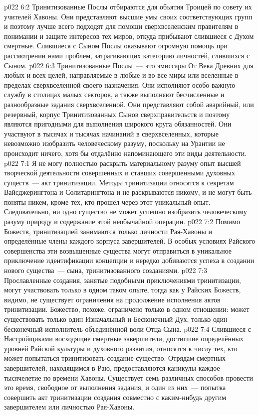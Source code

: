 \vs p022 6:2 Тринитизованные Послы отбираются для объятия Троицей по совету их учителей Хавоны. Они представляют высшие умы своих соответствующих групп и поэтому лучше всего подходят для помощи сверхвселенским правителям в понимании и защите интересов тех миров, откуда прибывают слившиеся с Духом смертные. Слившиеся с Сыном Послы оказывают огромную помощь при рассмотрении нами проблем, затрагивающих категорию личностей, слившихся с Сыном.
\vs p022 6:3 Тринитизованные Послы~--- это эмиссары От Века Древних для любых и всех целей, направляемые в любые и во все миры или вселенные в пределах сверхвселенной своего назначения. Они исполняют особо важную службу в столицах малых секторов, а также выполняют бесчисленные и разнообразные задания сверхвселенной. Они представляют собой аварийный, или резервный, корпус Тринитизованных Сынов сверхправительств и поэтому являются пригодными для выполнения широкого круга обязанностей. Они участвуют в тысячах и тысячах начинаний в сверхвселенных, которые невозможно изобразить человеческому разуму, поскольку на Урантии не происходит ничего, хотя бы отдалённо напоминающего эти виды деятельности.
\vs p022 7:1 Я не могу полностью раскрыть материальному разуму опыт высшей творческой деятельности совершенных и ставших совершенными духовных существ~--- акт тринитизации. Методы тринитизации относятся к секретам Вайсджерингтона и Солитарингтона и не раскрываются никому, и не могут быть поняты никем, кроме тех, кто прошёл через этот уникальный опыт. Следовательно, ни одно существо не может успешно изобразить человеческому разуму природу и содержание этой необычайной операции.
\vs p022 7:2 Помимо Божеств, тринитизацией занимаются только личности Рая\hyp{}Хавоны и определённые члены каждого корпуса завершителей. В особых условиях Райского совершенства эти возвышенные существа могут отправиться в уникальное приключение идентификации концепции и нередко добиваются успеха в создании нового существа~--- сына, тринитизованного созданиями.
\vs p022 7:3 Прославленные создания, занятые подобными приключениями тринитизации, могут участвовать только в одном таком опыте, тогда как у Райских Божеств, видимо, не существует ограничения на продолжение исполнения актов тринитизации. Божество, похоже, ограничено только в одном отношении: может существовать только один Изначальный и Бесконечный Дух, только один бесконечный исполнитель объединённой воли Отца\hyp{}Сына.
\vs p022 7:4 Слившиеся с Настройщиками восходящие смертные завершители, достигшие определённых уровней Райской культуры и духовного развития, относятся к числу тех, кто может попытаться тринитизовать создание\hyp{}существо. Отрядам смертных завершителей, находящимся в Раю, предоставляются каникулы каждое тысячелетие по времени Хавоны. Существует семь различных способов провести это время, свободное от выполнения задания, и один из них~--- попытка совершить акт тринитизации создания совместно с каким\hyp{}нибудь другим завершителем или личностью Рая\hyp{}Хавоны.
